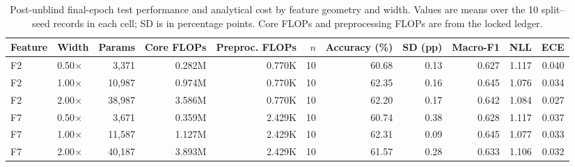 \begin{table}[!t]
\caption{Post-unblind final-epoch test performance and analytical cost by feature geometry and width. Values are means over the 10 split--seed records in each cell; SD is in percentage points. Core FLOPs and preprocessing FLOPs are from the locked ledger.}
\label{tab:test-cell-summary}
\centering
\footnotesize
\setlength{\tabcolsep}{3pt}
\begin{tabular*}{\textwidth}{@{\extracolsep{\fill}}llrrrrrrrrr@{}}
\toprule
Feature & Width & Params & Core FLOPs & Preproc. FLOPs & $n$ & Accuracy (\%) & SD (pp) & Macro-F1 & NLL & ECE \\
\midrule
F2 & 0.50$\times$ & 3,371 & 0.282M & 0.770K & 10 & 60.68 & 0.13 & 0.627 & 1.117 & 0.040 \\
F2 & 1.00$\times$ & 10,987 & 0.974M & 0.770K & 10 & 62.35 & 0.16 & 0.645 & 1.076 & 0.034 \\
F2 & 2.00$\times$ & 38,987 & 3.586M & 0.770K & 10 & 62.20 & 0.17 & 0.642 & 1.084 & 0.027 \\
F7 & 0.50$\times$ & 3,671 & 0.359M & 2.429K & 10 & 60.74 & 0.38 & 0.628 & 1.117 & 0.037 \\
F7 & 1.00$\times$ & 11,587 & 1.127M & 2.429K & 10 & 62.31 & 0.09 & 0.645 & 1.077 & 0.033 \\
F7 & 2.00$\times$ & 40,187 & 3.893M & 2.429K & 10 & 61.57 & 0.28 & 0.633 & 1.106 & 0.032 \\
\bottomrule
\end{tabular*}
\end{table}
